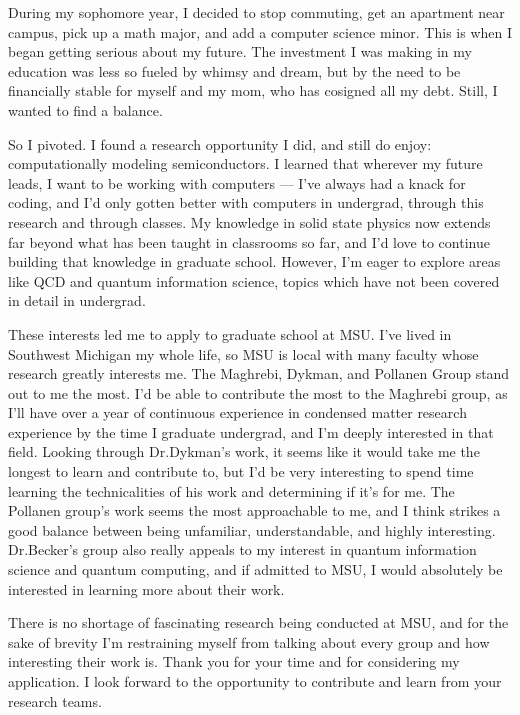 \documentclass[11pt]{article}
\begin{document}
During my sophomore year, I decided to stop commuting, get an apartment near campus, pick up a math major, and add a computer science minor. This is when I began getting serious about my future. The investment I was making in my education was less so fueled by whimsy and dream, but by the need to be financially stable for myself and my mom, who has cosigned all my debt. Still, I wanted to find a balance.

So I pivoted. I found a research opportunity I did, and still do enjoy: computationally modeling semiconductors. I learned that wherever my future leads, I want to be working with computers --- I've always had a knack for coding, and I'd only gotten better with computers in undergrad, through this research and through classes. My knowledge in solid state physics now extends far beyond what has been taught in classrooms so far, and I'd love to continue building that knowledge in graduate school. However, I'm eager to explore areas like QCD and quantum information science, topics which have not been covered in detail in undergrad.

These interests led me to apply to graduate school at MSU. I've lived in Southwest Michigan my whole life, so MSU is local with many faculty whose research greatly interests me. The Maghrebi, Dykman, and Pollanen Group stand out to me the most. I'd be able to contribute the most to the Maghrebi group, as I'll have over a year of continuous experience in condensed matter research experience by the time I graduate undergrad, and I'm deeply interested in that field. Looking through Dr.\@ Dykman's work, it seems like it would take me the longest to learn and contribute to, but I'd be very interesting to spend time learning the technicalities of his work and determining if it's for me. The Pollanen group's work seems the most approachable to me, and I think strikes a good balance between being unfamiliar, understandable, and highly interesting. Dr.\@ Becker's group also really appeals to my interest in quantum information science and quantum computing, and if admitted to MSU, I would absolutely be interested in learning more about their work.

There is no shortage of fascinating research being conducted at MSU, and for the sake of brevity I'm restraining myself from talking about every group and how interesting their work is. Thank you for your time and for considering my application. I look forward to the opportunity to contribute and learn from your research teams.

\end{document}
